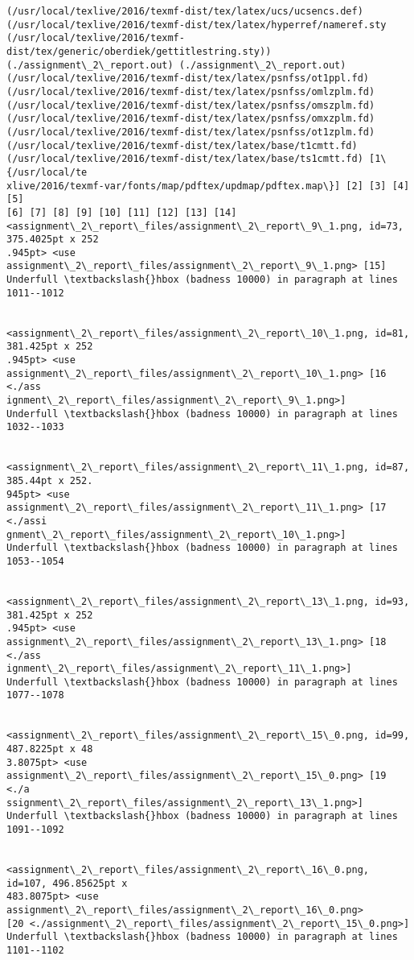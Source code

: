 \documentclass[11pt]{article}
\begin{document}
\begin{Verbatim}[commandchars=\\\{\}]
(/usr/local/texlive/2016/texmf-dist/tex/latex/ucs/ucsencs.def)
(/usr/local/texlive/2016/texmf-dist/tex/latex/hyperref/nameref.sty
(/usr/local/texlive/2016/texmf-dist/tex/generic/oberdiek/gettitlestring.sty))
(./assignment\_2\_report.out) (./assignment\_2\_report.out)
(/usr/local/texlive/2016/texmf-dist/tex/latex/psnfss/ot1ppl.fd)
(/usr/local/texlive/2016/texmf-dist/tex/latex/psnfss/omlzplm.fd)
(/usr/local/texlive/2016/texmf-dist/tex/latex/psnfss/omszplm.fd)
(/usr/local/texlive/2016/texmf-dist/tex/latex/psnfss/omxzplm.fd)
(/usr/local/texlive/2016/texmf-dist/tex/latex/psnfss/ot1zplm.fd)
(/usr/local/texlive/2016/texmf-dist/tex/latex/base/t1cmtt.fd)
(/usr/local/texlive/2016/texmf-dist/tex/latex/base/ts1cmtt.fd) [1\{/usr/local/te
xlive/2016/texmf-var/fonts/map/pdftex/updmap/pdftex.map\}] [2] [3] [4] [5]
[6] [7] [8] [9] [10] [11] [12] [13] [14]
<assignment\_2\_report\_files/assignment\_2\_report\_9\_1.png, id=73, 375.4025pt x 252
.945pt> <use assignment\_2\_report\_files/assignment\_2\_report\_9\_1.png> [15]
Underfull \textbackslash{}hbox (badness 10000) in paragraph at lines 1011--1012


<assignment\_2\_report\_files/assignment\_2\_report\_10\_1.png, id=81, 381.425pt x 252
.945pt> <use assignment\_2\_report\_files/assignment\_2\_report\_10\_1.png> [16 <./ass
ignment\_2\_report\_files/assignment\_2\_report\_9\_1.png>]
Underfull \textbackslash{}hbox (badness 10000) in paragraph at lines 1032--1033


<assignment\_2\_report\_files/assignment\_2\_report\_11\_1.png, id=87, 385.44pt x 252.
945pt> <use assignment\_2\_report\_files/assignment\_2\_report\_11\_1.png> [17 <./assi
gnment\_2\_report\_files/assignment\_2\_report\_10\_1.png>]
Underfull \textbackslash{}hbox (badness 10000) in paragraph at lines 1053--1054


<assignment\_2\_report\_files/assignment\_2\_report\_13\_1.png, id=93, 381.425pt x 252
.945pt> <use assignment\_2\_report\_files/assignment\_2\_report\_13\_1.png> [18 <./ass
ignment\_2\_report\_files/assignment\_2\_report\_11\_1.png>]
Underfull \textbackslash{}hbox (badness 10000) in paragraph at lines 1077--1078


<assignment\_2\_report\_files/assignment\_2\_report\_15\_0.png, id=99, 487.8225pt x 48
3.8075pt> <use assignment\_2\_report\_files/assignment\_2\_report\_15\_0.png> [19 <./a
ssignment\_2\_report\_files/assignment\_2\_report\_13\_1.png>]
Underfull \textbackslash{}hbox (badness 10000) in paragraph at lines 1091--1092


<assignment\_2\_report\_files/assignment\_2\_report\_16\_0.png, id=107, 496.85625pt x 
483.8075pt> <use assignment\_2\_report\_files/assignment\_2\_report\_16\_0.png>
[20 <./assignment\_2\_report\_files/assignment\_2\_report\_15\_0.png>]
Underfull \textbackslash{}hbox (badness 10000) in paragraph at lines 1101--1102



\end{Verbatim}
\end{document}
